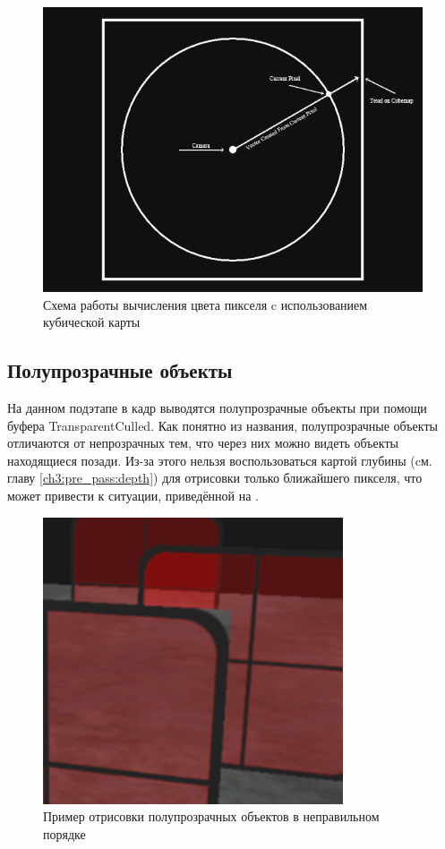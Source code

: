 		\begin{figure}[ht!] 
			\center
			\includegraphics [scale=1] {my_folder/images//cube_sample}	
			\caption{Схема работы вычисления цвета пикселя c использованием кубической карты} 
			\label{fig:cube_sample}
		\end{figure}
		
	\subsection{Полупрозрачные объекты} \label{ch3:render_pass:transparents}
		На данном подэтапе в кадр выводятся полупрозрачные объекты при помощи буфера TransparentCulled. Как понятно из названия, полупрозрачные объекты отличаются от непрозрачных тем, что через них можно видеть объекты находящиеся позади. Из-за этого нельзя воспользоваться картой глубины (cм. главу \ref{ch3:pre_pass:depth}) для отрисовки только ближайшего пикселя, что может привести к ситуации, приведённой на .
		
		\begin{figure}[ht!] 
			\center
			\includegraphics [scale=0.5] {my_folder/images//incorrect_transparent}	
			\caption{Пример отрисовки полупрозрачных объектов в неправильном порядке} 
			\label{fig:incorrect_transparent}
		\end{figure}
		\FloatBarrier
		
